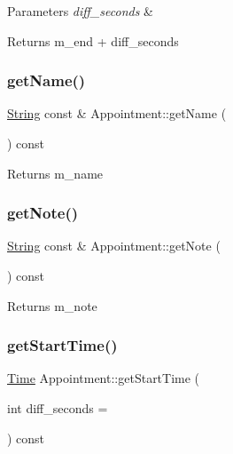 \begin{DoxyParams}{Parameters}
{\em diff\+\_\+seconds} & \\
\hline
\end{DoxyParams}
\begin{DoxyReturn}{Returns}
m\+\_\+end + diff\+\_\+seconds 
\end{DoxyReturn}
\mbox{\label{classAppointment_ab2cbd469ff67c37c34a91c02a1ba9d35}} 
\subsubsection{\texorpdfstring{get\+Name()}{getName()}}
{\footnotesize\ttfamily \hyperlink{classString}{String} const  \& Appointment\+::get\+Name (\begin{DoxyParamCaption}{ }\end{DoxyParamCaption}) const}

\begin{DoxyReturn}{Returns}
m\+\_\+name 
\end{DoxyReturn}
\mbox{\label{classAppointment_aaf6078fe8f092e321a38d173bc7093c3}} 
\subsubsection{\texorpdfstring{get\+Note()}{getNote()}}
{\footnotesize\ttfamily \hyperlink{classString}{String} const  \& Appointment\+::get\+Note (\begin{DoxyParamCaption}{ }\end{DoxyParamCaption}) const}

\begin{DoxyReturn}{Returns}
m\+\_\+note 
\end{DoxyReturn}
\mbox{\label{classAppointment_a577870c4d05eb584d58c61c98b9b65a0}} 
\subsubsection{\texorpdfstring{get\+Start\+Time()}{getStartTime()}}
{\footnotesize\ttfamily \hyperlink{classTime}{Time} Appointment\+::get\+Start\+Time (\begin{DoxyParamCaption}\item[{int}]{diff\+\_\+seconds = {} }\end{DoxyParamCaption}) const}


